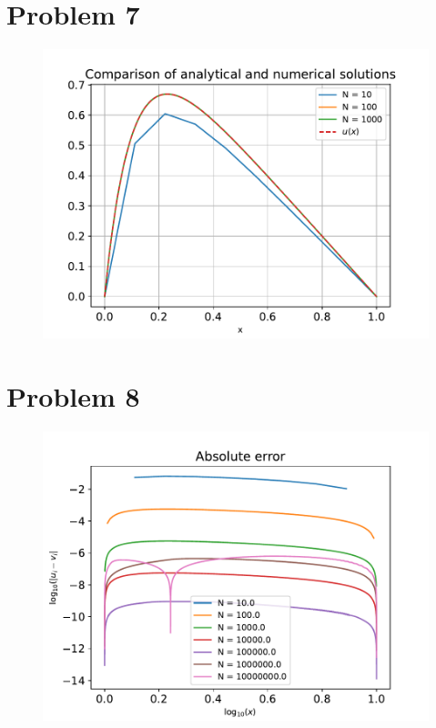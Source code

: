 \documentclass[english,notitlepage]{revtex4-1}  %
\begin{document}
        
\section*{Problem 7}
    \begin{figure}[!ht]
        \centering
        \includegraphics[scale=0.7]{comparison.pdf}
        \caption{}
        \label{comparison_plot}
    \end{figure}
        
    
\section*{Problem 8}
    \begin{figure}[!ht]
        \centering
        \includegraphics[scale=0.7]{abs_error.pdf}
        \caption{}
        \label{abs_error}
    \end{figure}
\end{document}
